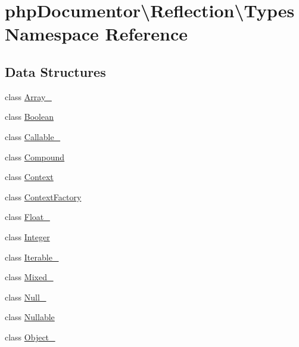 \hypertarget{namespacephp_documentor_1_1_reflection_1_1_types}{}\section{php\+Documentor\textbackslash{}Reflection\textbackslash{}Types Namespace Reference}
\label{namespacephp_documentor_1_1_reflection_1_1_types}
\subsection*{Data Structures}
\begin{DoxyCompactItemize}
\item 
class \mbox{\hyperlink{classphp_documentor_1_1_reflection_1_1_types_1_1_array__}{Array\+\_\+}}
\item 
class \mbox{\hyperlink{classphp_documentor_1_1_reflection_1_1_types_1_1_boolean}{Boolean}}
\item 
class \mbox{\hyperlink{classphp_documentor_1_1_reflection_1_1_types_1_1_callable__}{Callable\+\_\+}}
\item 
class \mbox{\hyperlink{classphp_documentor_1_1_reflection_1_1_types_1_1_compound}{Compound}}
\item 
class \mbox{\hyperlink{classphp_documentor_1_1_reflection_1_1_types_1_1_context}{Context}}
\item 
class \mbox{\hyperlink{classphp_documentor_1_1_reflection_1_1_types_1_1_context_factory}{Context\+Factory}}
\item 
class \mbox{\hyperlink{classphp_documentor_1_1_reflection_1_1_types_1_1_float__}{Float\+\_\+}}
\item 
class \mbox{\hyperlink{classphp_documentor_1_1_reflection_1_1_types_1_1_integer}{Integer}}
\item 
class \mbox{\hyperlink{classphp_documentor_1_1_reflection_1_1_types_1_1_iterable__}{Iterable\+\_\+}}
\item 
class \mbox{\hyperlink{classphp_documentor_1_1_reflection_1_1_types_1_1_mixed__}{Mixed\+\_\+}}
\item 
class \mbox{\hyperlink{classphp_documentor_1_1_reflection_1_1_types_1_1_null__}{Null\+\_\+}}
\item 
class \mbox{\hyperlink{classphp_documentor_1_1_reflection_1_1_types_1_1_nullable}{Nullable}}
\item 
class \mbox{\hyperlink{classphp_documentor_1_1_reflection_1_1_types_1_1_object__}{Object\+\_\+}}

\end{DoxyCompactItemize}
